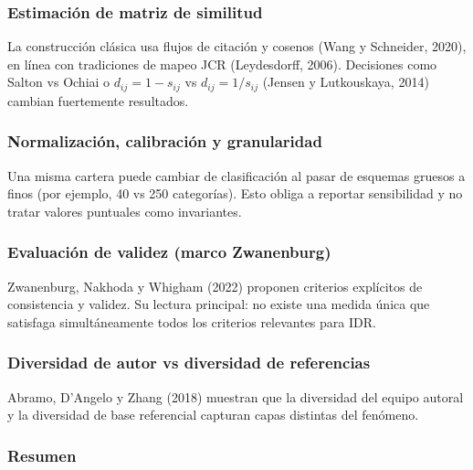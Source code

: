 \documentclass[
]{article}
\begin{document}
\hypertarget{estimaciuxf3n-de-matriz-de-similitud}{%
\subsubsection{Estimación de matriz de
similitud}\label{estimaciuxf3n-de-matriz-de-similitud}}

La construcción clásica usa flujos de citación y cosenos (Wang y
Schneider, 2020), en línea con tradiciones de mapeo JCR (Leydesdorff,
2006). Decisiones como Salton vs Ochiai o \(d_{ij}=1-s_{ij}\) vs
\(d_{ij}=1/s_{ij}\) (Jensen y Lutkouskaya, 2014) cambian fuertemente
resultados.

\hypertarget{normalizaciuxf3n-calibraciuxf3n-y-granularidad}{%
\subsubsection{Normalización, calibración y
granularidad}\label{normalizaciuxf3n-calibraciuxf3n-y-granularidad}}

Una misma cartera puede cambiar de clasificación al pasar de esquemas
gruesos a finos (por ejemplo, 40 vs 250 categorías). Esto obliga a
reportar sensibilidad y no tratar valores puntuales como invariantes.

\hypertarget{evaluaciuxf3n-de-validez-marco-zwanenburg}{%
\subsubsection{Evaluación de validez (marco
Zwanenburg)}\label{evaluaciuxf3n-de-validez-marco-zwanenburg}}

Zwanenburg, Nakhoda y Whigham (2022) proponen criterios explícitos de
consistencia y validez. Su lectura principal: no existe una medida única
que satisfaga simultáneamente todos los criterios relevantes para IDR.

\hypertarget{diversidad-de-autor-vs-diversidad-de-referencias}{%
\subsubsection{Diversidad de autor vs diversidad de
referencias}\label{diversidad-de-autor-vs-diversidad-de-referencias}}

Abramo, D'Angelo y Zhang (2018) muestran que la diversidad del equipo
autoral y la diversidad de base referencial capturan capas distintas del
fenómeno.

\hypertarget{resumen}{%
\subsubsection{Resumen}\label{resumen}}
\end{document}
